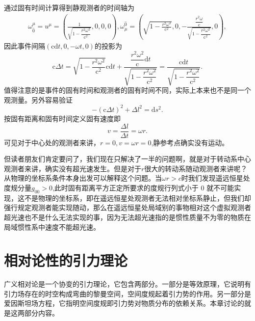 \documentclass[11pt, a4paper, oneside, onecolumn]{ctexart}
\numberwithin{equation}{subsection}
\begin{document}
通过固有时间计算得到静观测者的时间轴为
\begin{align}
\omega_{\hat{0}}^{\mu}=u^{\mu}=\left(\frac{1}{\sqrt{1-\dfrac{r^{2}\omega^{2}}{\mathrm{c}^{2}}}},0,0,0\right),\omega_{\mu}^{\hat{0}}=\left(\sqrt{1-\frac{r^{2}\omega^{2}}{\mathrm{c}^{2}}},0,-\frac{\dfrac{r^{2}\omega}{\mathrm{c}}}{\sqrt{1-\dfrac{r^{2}\omega^{2}}{\mathrm{c}^{2}}}},0\right),
\end{align}
因此事件间隔$\left(\mathrm{c}\mathrm{d}t,0,-\omega t,0\right)$的投影为
\begin{equation}
\mathrm{c}\Delta{}t=\sqrt{1-\frac{r^{2}\omega^{2}}{\mathrm{c}^{2}}}\mathrm{c}\mathrm{d}t+\frac{\dfrac{r^{2}\omega^{2}}{\mathrm{c}}\mathrm{d}t}{\sqrt{1-\dfrac{r^{2}\omega^{2}}{\mathrm{c}^{2}}}}=\frac{\mathrm{c}\mathrm{d}t}{\sqrt{1-\dfrac{r^{2}\omega^{2}}{\mathrm{c}^{2}}}}.
\end{equation}
值得注意的是事件的固有时间和观测者的固有时间不同，实际上本来也不是同一个观测量。另外容易验证
\begin{equation}
-\left(\mathrm{c}\Delta{}t\right)^{2}+\Delta{}l^{2}=\mathrm{d}s^{2}.
\end{equation}
按固有距离和固有时间定义固有速度即
\begin{equation}
v=\frac{\Delta{}l}{\Delta{}t}=\omega r.
\end{equation}
可见对于中心处的观测者来讲，$r=0,v=\omega r=0$,静参考点确实没有运动。

但读者朋友们肯定要问了，我们现在只解决了一半的问题啊，就是对于转动系中心观测者来讲，确实没有超光速发生。但是对于$r$很大的转动系随动观测者来讲呢？从物理的坐标系条件本身出发可以解释这个问题。当$\omega r>c$时我们发现遥远恒星处度规分量$g_{00}>0$,此时固有距离平方正定所要求的度规行列式小于 0 就不可能实现，这不是物理的坐标系，即在遥远恒星处观测者无法相对坐标系静止，但我们却强行规定观测者能实现随动，那么在遥远恒星处局域别的事物相对这个虚拟观测者超光速也不是什么无法实现的事，因为无法超光速指的是惯性质量不为零的物质在局域惯性系中速度不能超光速。

\newpage
\section{相对论性的引力理论}
广义相对论是⼀个协变的引⼒理论，它包含两部分。⼀部分是等效原理，它说明有引⼒场存在的时空构成弯曲的黎曼空间，空间度规起着引⼒势的作⽤。另⼀部分是爱因斯坦场⽅程，它指明空间度规即引⼒势对物质分布的依赖关系。本章讨论的就是这两部分内容。
\end{document}
